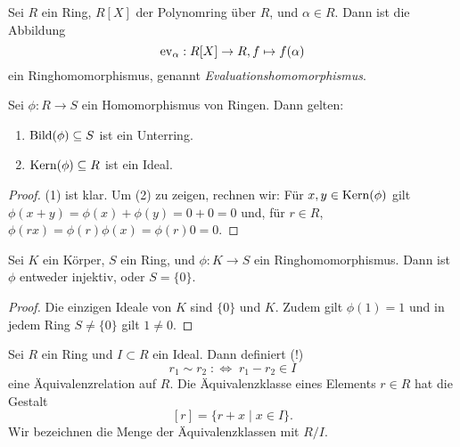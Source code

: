 \documentclass{book}
\begin{document}
\begin{exa}
    \label{exa:evaluation}
    Sei $R$ ein Ring, $R[X]$ der Polynomring über $R$, und $\alpha \in R$. Dann ist die Abbildung
    \[
        \operatorname{ev}_{\alpha}: R[X] \to R, f \mapsto f(\alpha)
    \]
    ein Ringhomomorphismus, genannt \emph{Evaluationshomomorphismus}.
\end{exa}

\begin{prop}
    \label{prop:kern}
    Sei $\phi: R \to S$ ein Homomorphismus von Ringen. Dann gelten:
    \begin{enumerate}
        \item $\Bild(\phi) \subset S$ ist ein Unterring. 
        \item $\Kern(\phi) \subset R$ ist ein Ideal.
    \end{enumerate}
\end{prop}
\begin{proof}
    (1) ist klar. Um (2) zu zeigen, rechnen wir: Für $x,y \in \Kern(\phi)$ gilt
    $\phi(x+y) = \phi(x) + \phi(y) = 0 + 0 = 0$ und, für $r \in R$, $\phi(rx) =
    \phi(r)\phi(x) = \phi(r) 0 = 0$.
\end{proof}

\begin{cor}
    \label{cor:fieldring}
    Sei $K$ ein Körper, $S$ ein Ring, und $\phi: K \to S$ ein Ringhomomorphismus. Dann ist $\phi$ entweder injektiv, oder $S = \{0\}$. 
\end{cor}
\begin{proof}
    Die einzigen Ideale von $K$ sind $\{0\}$ und $K$. Zudem gilt $\phi(1) = 1$
    und in jedem Ring $S \ne \{0\}$ gilt $1 \ne 0$. 
\end{proof}

Sei $R$ ein Ring und $I \subset R$ ein Ideal. Dann definiert (!) 
\[
    r_1 \sim r_2 \; : \Leftrightarrow\; r_1 - r_2 \in I
\]
eine Äquivalenzrelation auf $R$. Die Äquivalenzklasse eines Elements $r \in R$
hat die Gestalt
\[
    [r] = \{r + x \;|\; x \in I\}.
\]
Wir bezeichnen die Menge der Äquivalenzklassen mit $R/I$. 
\end{document}
